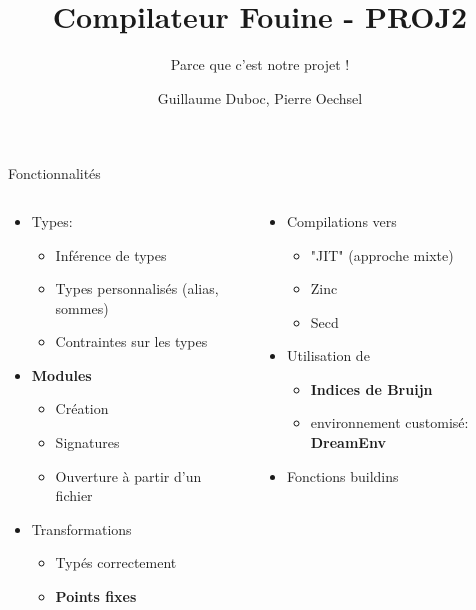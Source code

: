 \documentclass[10pt]{beamer}
\title{Compilateur Fouine - PROJ2}
\subtitle{Parce que c'est notre projet !}
\date{}
\author{Guillaume Duboc, Pierre Oechsel}
\institute{ENS de Lyon}
\begin{document}
\maketitle
\begin{frame}{Fonctionnalités}
\begin{columns}
\begin{column}{0.48\linewidth}

\begin{itemize}
	\item Types:
	\begin{itemize}
	\item Inférence de types
	\item Types personnalisés (alias, sommes)
	\item Contraintes sur les types
\end{itemize}
\item \textbf{Modules}
\begin{itemize}
	\item Création
	\item Signatures
	\item Ouverture à partir d'un fichier
\end{itemize}
\item Transformations
	\begin{itemize}
		\item Typés correctement
		\item \textbf{Points fixes}
	\end{itemize}
\end{itemize}

\end{column}

\begin{column}{.48\linewidth}
	\begin{itemize}
		\item Compilations vers
		\begin{itemize}
			\item "JIT" (approche mixte)
			\item Zinc
			\item Secd
		\end{itemize}
		\item Utilisation de
		\begin{itemize}
			\item \textbf{Indices de Bruijn}
			\item environnement customisé: \textbf{DreamEnv}
		\end{itemize}
	
	\item Fonctions buildins
	\end{itemize}
\end{column}
\end{columns}
\end{frame}
\end{document}
